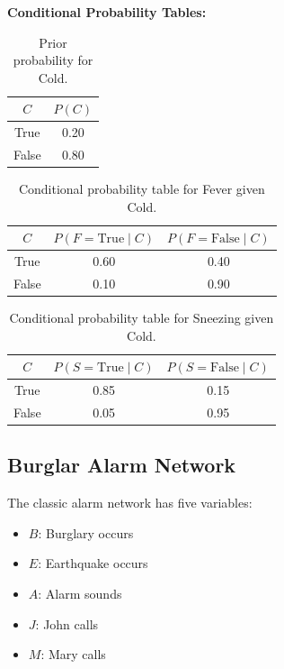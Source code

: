 \textbf{Conditional Probability Tables:}

\begin{table}[H]
\centering
\begin{tabular}{cc}
\hline
$C$ & $P(C)$ \\\hline
True  & 0.20 \\
False & 0.80 \\\hline
\end{tabular}
\caption{Prior probability for Cold.}
\end{table}

\begin{table}[H]
\centering
\begin{tabular}{ccc}
\hline
$C$ & $P(F=\text{True}\mid C)$ & $P(F=\text{False}\mid C)$ \\\hline
True  & 0.60 & 0.40 \\
False & 0.10 & 0.90 \\\hline
\end{tabular}
\caption{Conditional probability table for Fever given Cold.}
\end{table}

\begin{table}[H]
\centering
\begin{tabular}{ccc}
\hline
$C$ & $P(S=\text{True}\mid C)$ & $P(S=\text{False}\mid C)$ \\\hline
True  & 0.85 & 0.15 \\
False & 0.05 & 0.95 \\\hline
\end{tabular}
\caption{Conditional probability table for Sneezing given Cold.}
\end{table}

\FloatBarrier

\subsection{Burglar Alarm Network}

The classic alarm network has five variables:
\begin{itemize}
    \item $B$: Burglary occurs
    \item $E$: Earthquake occurs
    \item $A$: Alarm sounds
    \item $J$: John calls
    \item $M$: Mary calls
\end{itemize}

